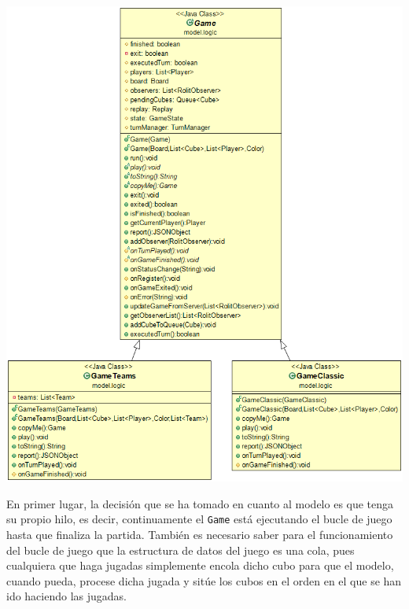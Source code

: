 \documentclass[../DocumentoOficial.tex]{subfiles}
\begin{document}
\begin{center}
\includegraphics[scale=0.5]{gamefinal.png}
\end{center}
En primer lugar, la decisión que se ha tomado en cuanto al modelo es que tenga su propio hilo, es decir, continuamente el \texttt{Game} está ejecutando el bucle de juego hasta que finaliza la partida. También es necesario saber para el funcionamiento del bucle de juego que la estructura de datos del juego es una cola, pues cualquiera que haga jugadas simplemente encola dicho cubo para que el modelo, cuando pueda, procese dicha jugada y sitúe los cubos en el orden en el que se han ido haciendo las jugadas.
\end{document}

